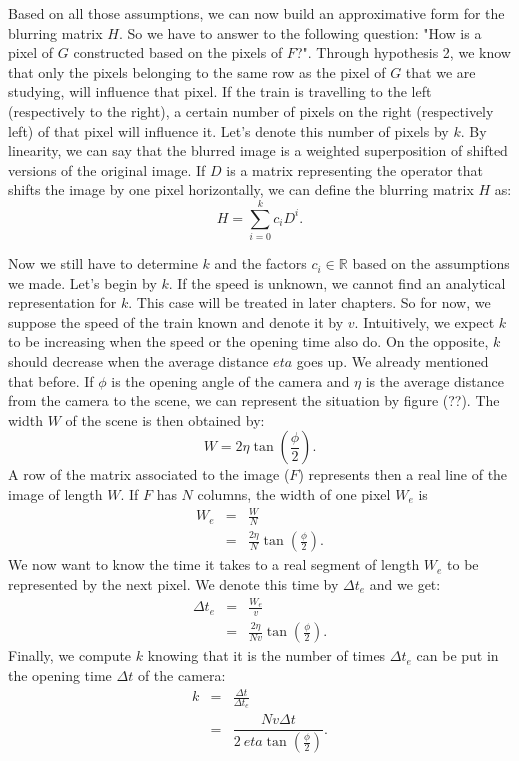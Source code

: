 Based on all those assumptions, we can now build an approximative form for the blurring matrix $H$. So we have to answer to the following question: "How is a pixel of $G$ constructed based on the pixels of $F$?". Through hypothesis 2, we know that only the pixels belonging to the same row as the pixel of $G$ that we are studying, will influence that pixel. If the train is travelling to the left (respectively to the right), a certain number of pixels on the right (respectively left) of that pixel will influence it. Let's denote this number of pixels by $k$. By linearity, we can say that the blurred image is a weighted superposition of shifted versions of the original image. If $D$ is a matrix representing the operator that shifts the image by one pixel horizontally, we can define the blurring matrix $H$ as:
\begin{equation}
H=\sum_{i=0}^{k} c_i D^{i}.
\label{eqHtrain}
\end{equation}

Now we still have to determine $k$ and the factors $c_i \in \mathbb{R}$ based on the assumptions we made. Let's begin by $k$. If the speed is unknown, we cannot find an analytical representation for $k$. This case will be treated in later chapters. So for now, we suppose the speed of the train known and denote it by $v$. Intuitively, we expect $k$ to be increasing when the speed or the opening time also do. On the opposite, $k$ should decrease when the average distance $eta$ goes up. We already mentioned that before. If $\phi$ is the opening angle of the camera and $\eta$ is the average distance from the camera to the scene, we can represent the situation by figure (??). The width $W$ of the scene is then obtained by: %
\begin{equation}
W = 2 \eta \tan\left(\frac{\phi}{2}\right).
\end{equation}
A row of the matrix associated to the image ($F$) represents then a real line of the image of length $W$. If $F$ has $N$ columns, the width of one pixel $W_e$ is
\begin{eqnarray}
W_e &=& \frac{W}{N} \\
&=& \frac{2 \eta }{N}\tan\left(\frac{\phi}{2}\right).
\end{eqnarray}
We now want to know the time it takes to a real segment of length $W_e$ to be represented by the next pixel. We denote this time by $\Delta t_e$ and we get:
\begin{eqnarray}
\Delta t_e &=&\frac{W_e}{v}\\
&=& \frac{2 \eta }{Nv}\tan\left(\frac{\phi}{2}\right).
\end{eqnarray}
Finally, we compute $k$ knowing that it is the number of times $\Delta t_e$ can be put in the opening time $\Delta t$ of the camera:
\begin{eqnarray}
k &=& \frac{\Delta t}{\Delta t _e} \\
&=& \dfrac{Nv\Delta t}{2 \ eta \tan\left(\frac{\phi}{2}\right)}.
\end{eqnarray}


